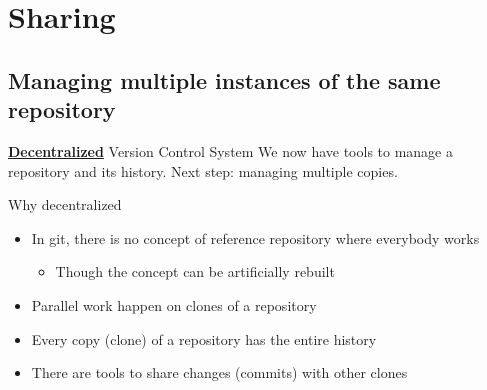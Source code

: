 \documentclass[presentation]{beamer}
\begin{document}
\section{Sharing}

\subsection{Managing multiple instances of the same repository}

\begin{frame}{\underline{\textbf{Decentralized}} Version Control System}
    We now have tools to manage a repository and its history. Next step: managing multiple copies.
    \begin{block}{Why decentralized}
        \begin{itemize}
            \item In git, there is no concept of reference repository where everybody works
            \begin{itemize}
                \item Though the concept can be artificially rebuilt
            \end{itemize}
            \item Parallel work happen on clones of a repository
            \item Every copy (clone) of a repository has the entire history
            \item There are tools to share changes (commits) with other clones
        \end{itemize}
    \end{block}
\end{frame}
\end{document}
